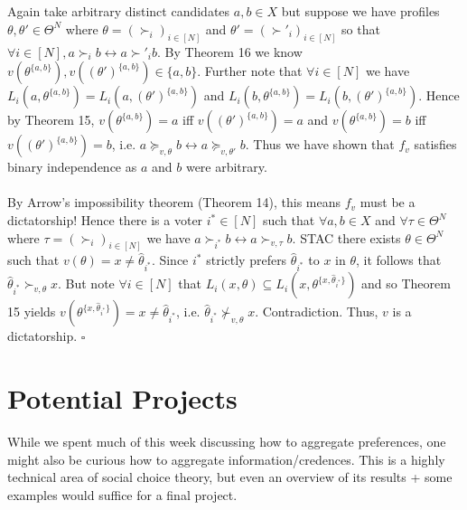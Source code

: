 \documentclass[11pt]{article}
\theoremstyle{definition}
\theoremstyle{plain}
\begin{document}
\\
\\
Again take arbitrary distinct candidates $a,b \in X$ but suppose we have profiles $\theta, \theta' \in \Theta^N$ where $\theta=(\succ_i)_{i \in [N]}$ and $\theta'=(\succ'_i)_{i \in [N]}$ so that $\forall i \in [N], a \succ_i b \leftrightarrow a \succ'_i b$.  By Theorem 16 we know $v(\theta^{\{a,b\}}),v((\theta')^{\{a,b\}}) \in \{a,b\}$. Further note that $\forall i \in [N]$ we have $L_i(a,\theta^{\{a,b\}})=L_i(a,(\theta')^{\{a,b\}})$ and  $L_i(b,\theta^{\{a,b\}})=L_i(b,(\theta')^{\{a,b\}})$. Hence by Theorem 15, $v(\theta^{\{a,b\}})=a$ iff $v((\theta')^{\{a,b\}})=a$ and $v(\theta^{\{a,b\}})=b$ iff $v((\theta')^{\{a,b\}})=b$, i.e. $a \succeq_{v,\theta} b \leftrightarrow a \succeq_{v,\theta'} b $. Thus we have shown that $f_v$ satisfies binary independence as $a$ and $b$ were arbitrary.
\\
\\
By Arrow's impossibility theorem (Theorem 14), this means $f_v$ must be a dictatorship! Hence there is a voter $i^* \in [N]$ such that $\forall a,b \in X$ and $\forall \tau \in \Theta^N$ where $\tau=(\succ_{i})_{i \in [N]}$ we have  $a \succ_{i^*} b \leftrightarrow a \succ_{v,\tau} b$. STAC there exists $\theta \in \Theta^N$ such that $v(\theta)=x \neq \hat{\theta}_{i^*}$. Since $i^*$ strictly prefers $\hat{\theta}_{i^*}$ to $x$ in $\theta$, it follows that $\hat{\theta}_{i^*} \succ_{v, \theta} x$. But note $\forall i \in [N]$ that $L_i(x,\theta) \subseteq L_i(x,\theta^{\{x,\hat{\theta}_{i^*}\}})$ and so Theorem 15 yields $v(\theta^{\{x,\hat{\theta}_{i^*}\}})=x \neq \hat{\theta}_{i^*} $, i.e. $\hat{\theta}_{i^*} \not \succ_{v, \theta} x$. Contradiction. Thus, $v$ is a dictatorship. $\square$
 
\section{Potential Projects}
While we spent much of this week discussing how to aggregate preferences, one might also be curious how to aggregate information/credences. This is a highly technical area of social choice theory, but even an overview of its results + some examples would suffice for a final project.
\end{document}
